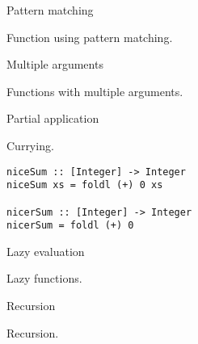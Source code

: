 %
\begin{frame}[fragile]{Pattern matching}

Function using pattern matching.

\end{frame}

%
\begin{frame}[fragile]{Multiple arguments}

Functions with multiple arguments.

\end{frame}

%
\begin{frame}[fragile]{Partial application}

Currying.



\begin{verbatim}
niceSum :: [Integer] -> Integer
niceSum xs = foldl (+) 0 xs

nicerSum :: [Integer] -> Integer
nicerSum = foldl (+) 0
\end{verbatim}

\end{frame}

%
\begin{frame}[fragile]{Lazy evaluation}

Lazy functions.

\end{frame}

%
\begin{frame}[fragile]{Recursion}

Recursion.

\end{frame}

